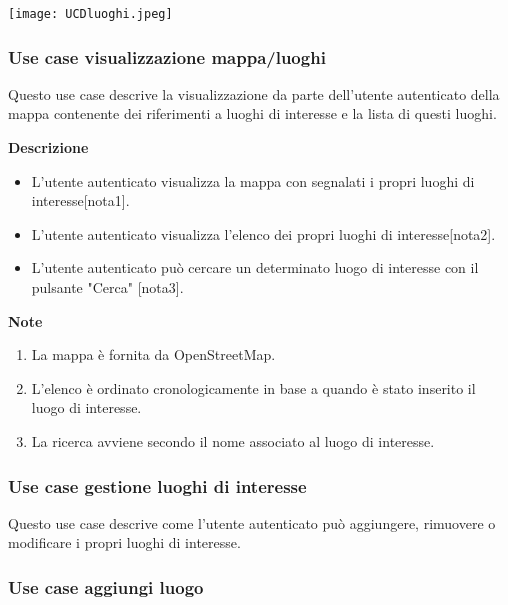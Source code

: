 \documentclass[a4paper,12pt]{article}
\begin{document}
\begin{center}
  \texttt{[image: UCDluoghi.jpeg]}
\end{center}



\subsubsection*{Use case visualizzazione mappa/luoghi}

Questo use case descrive la visualizzazione da parte dell'utente autenticato della mappa contenente dei riferimenti a luoghi di interesse e la lista di questi luoghi.

\textbf{Descrizione}
\begin{itemize} \setlength\itemsep{0.01em}
\item L'utente autenticato visualizza la mappa con segnalati i propri luoghi di interesse[nota1].
\item L'utente autenticato visualizza l'elenco dei propri luoghi di interesse[nota2].
\item L'utente autenticato può cercare un determinato luogo di interesse con il pulsante "Cerca" [nota3].
\end{itemize}

\textbf{Note}
\begin{enumerate} \setlength\itemsep{0.01em}
\item La mappa è fornita da OpenStreetMap.
\item L'elenco è ordinato cronologicamente in base a quando è stato inserito il luogo di interesse.
\item La ricerca avviene secondo il nome associato al luogo di interesse.
\end{enumerate}




\subsubsection*{Use case gestione luoghi di interesse}

Questo use case descrive come l'utente autenticato può aggiungere, rimuovere o modificare i propri luoghi di interesse.



\subsubsection*{Use case aggiungi luogo}
\end{document}
